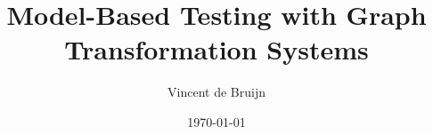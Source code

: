 \documentclass[a4paper]{article}
\begin{document}
	\title{\textbf{Model-Based Testing with Graph Transformation Systems}}
	\author{Vincent de Bruijn}
	\date{\today}
	\maketitle
	
	
	
	\newpage
	\tableofcontents
  \newpage
	
	
	
	
	
	

	{}
	
	
	\appendix
  \newpage
	
\end{document}
